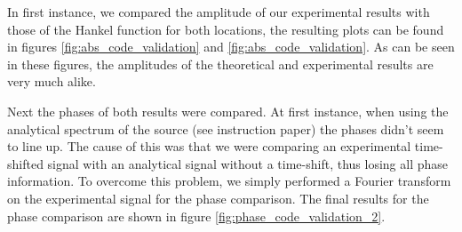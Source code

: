 \documentclass[11pt, a4paper]{article}
\begin{document}
In first instance, we compared the amplitude of our experimental results with those of the Hankel function for both locations, the resulting plots can be found in figures \ref{fig:abs_code_validation} and \ref{fig:abs_code_validation}. As can be seen in these figures, the amplitudes of the theoretical and experimental results are very much alike.

Next the phases of both results were compared. At first instance, when using the analytical spectrum of the source (see instruction paper) the phases didn't seem to line up. The cause of this was that we were comparing an experimental time-shifted signal with an analytical signal without a time-shift, thus losing all phase information. To overcome this problem, we simply performed a Fourier transform on the experimental signal for the phase comparison. The final results for the phase comparison are shown in figure \ref{fig:phase_code_validation_2}.
\end{document}
